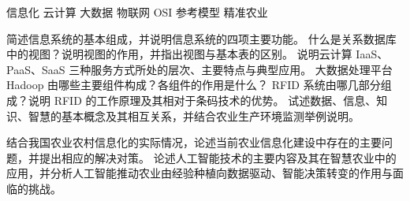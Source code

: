\documentclass[a4paper,11pt]{article}
\begin{document}

\q 信息化\anslines{2.0cm}
\q 云计算\anslines{2.0cm}
\q 大数据\anslines{2.0cm}
\q 物联网\anslines{2.0cm}
\q OSI 参考模型\anslines{2.0cm}
\q 精准农业\anslines{2.0cm}
\newpage

\q 简述信息系统的基本组成，并说明信息系统的四项主要功能。\anslines{3.2cm}
\q 什么是关系数据库中的视图？说明视图的作用，并指出视图与基本表的区别。\anslines{3.2cm}
\q 说明云计算 IaaS、PaaS、SaaS 三种服务方式所处的层次、主要特点与典型应用。\anslines{3.2cm}
\newpage
\q 大数据处理平台 Hadoop 由哪些主要组件构成？各组件的作用是什么？\anslines{3.2cm}
\q RFID 系统由哪几部分组成？说明 RFID 的工作原理及其相对于条码技术的优势。\anslines{3.2cm}
\q 试述数据、信息、知识、智慧的基本概念及其相互关系，并结合农业生产环境监测举例说明。\anslines{3.2cm}
\newpage

\q 结合我国农业农村信息化的实际情况，论述当前农业信息化建设中存在的主要问题，并提出相应的解决对策。\anslines{11cm}
\newpage
\q 论述人工智能技术的主要内容及其在智慧农业中的应用，并分析人工智能推动农业由经验种植向数据驱动、智能决策转变的作用与面临的挑战。\anslines{13cm}
\end{document}
